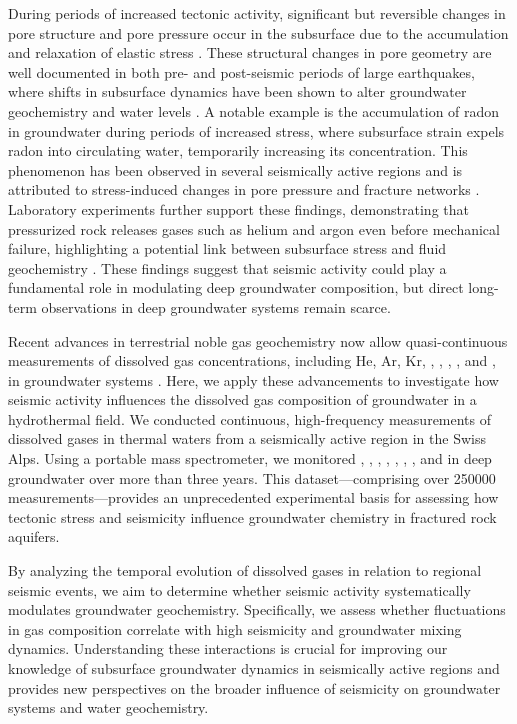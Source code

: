 During periods of increased tectonic activity, significant but reversible changes in pore structure and pore pressure occur in the subsurface due to the accumulation and relaxation of elastic stress \citep{nakagomi2021stress, liu2024opposite}.
These structural changes in pore geometry are well documented in both pre- and post-seismic periods of large earthquakes, where shifts in subsurface dynamics have been shown to alter groundwater geochemistry and water levels \citep{won2019response, rutter2016aquifer}.
A notable example is the accumulation of radon in groundwater during periods of increased stress, where subsurface strain expels radon into circulating water, temporarily increasing its concentration.
This phenomenon has been observed in several seismically active regions and is attributed to stress-induced changes in pore pressure and fracture networks \citep{tarakci2014investigation, dincecco2021co2, igarashi1995radon}.
Laboratory experiments further support these findings, demonstrating that pressurized rock releases gases such as helium and argon even before mechanical failure, highlighting a potential link between subsurface stress and fluid geochemistry \citep{honda1982release, bauer2016release, bauer2019release, roques2020helium}.
These findings suggest that seismic activity could play a fundamental role in modulating deep groundwater composition, but direct long-term observations in deep groundwater systems remain scarce.

Recent advances in terrestrial noble gas geochemistry now allow quasi-continuous measurements of dissolved gas concentrations, including He, Ar, Kr, , , , , and , in groundwater systems \citep{brennwald2016portable, giroud2023new}.
Here, we apply these advancements to investigate how seismic activity influences the dissolved gas composition of groundwater in a hydrothermal field.
We conducted continuous, high-frequency measurements of dissolved gases in thermal waters from a seismically active region in the Swiss Alps.
Using a portable mass spectrometer, we monitored , , , , , , , and  in deep groundwater over more than three years.
This dataset---comprising over \num{250000} measurements---provides an unprecedented experimental basis for assessing how tectonic stress and seismicity influence groundwater chemistry in fractured rock aquifers.

By analyzing the temporal evolution of dissolved gases in relation to regional seismic events, we aim to determine whether seismic activity systematically modulates groundwater geochemistry.
Specifically, we assess whether fluctuations in gas composition correlate with high seismicity and groundwater mixing dynamics.
Understanding these interactions is crucial for improving our knowledge of subsurface groundwater dynamics in seismically active regions and provides new perspectives on the broader influence of seismicity on groundwater systems and water geochemistry.

